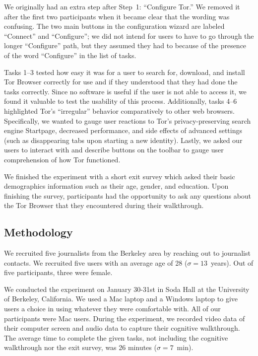 \documentclass[letterpaper,twocolumn,11pt]{article}
\begin{document}
We originally had an extra step after Step~1: ``Configure Tor.''
We removed it after the first two participants
when it became clear that the wording was confusing.
The two main buttons in the configuration wizard are labeled
``Connect'' and ``Configure''; we did not intend for users
to have to go through the longer ``Configure'' path,
but they assumed they had to because of the presence
of the word ``Configure'' in the list of tasks.

Tasks 1--3 tested how easy it was for a user to search for, download, and install Tor Browser 
correctly for use and if they understood that they had done the tasks correctly. 
Since no software is useful if the user is not able to access it, we found it valuable
to test the usability of this process.  Additionally, tasks 4--6 highlighted Tor's ``irregular'' behavior 
comparatively to other web browsers. Specifically, we wanted to gauge user reactions to Tor's
privacy-preserving search engine Startpage, decreased performance, 
and side effects of advanced settings (such as disappearing tabs upon starting a new identity).
 Lastly, we asked our users to 
interact with and describe buttons on the toolbar to gauge user comprehension of how Tor functioned.

We finished the experiment with a short exit survey which asked their basic demographics information 
such as their age, gender, and education. Upon finishing the survey, participants had the opportunity to 
ask any questions about the Tor Browser that they encountered during their walkthrough. 

\subsection{Methodology} 
\indent \indent We recruited five journalists from the Berkeley area by reaching out to journalist contacts.
 We recruited five users with an average age of 28 ($\sigma = 13 $~years).  Out of  %
five participants, three were female. 

We conducted the experiment on January 30-31st in Soda 
Hall at the University of Berkeley, California. We used a Mac laptop and a 
Windows laptop to give users a choice in using whatever they were comfortable with. 
All of our participants were Mac users. During the experiment, 
we recorded video data of their computer screen and audio data to capture their cognitive walkthrough. 
The average time to complete the given tasks, not including the cognitive
walkthrough nor the exit survey, was 26 minutes ($\sigma = 7$~min). 
\end{document}
